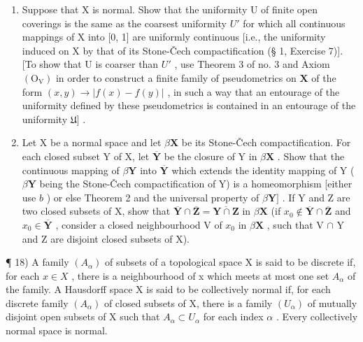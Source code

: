 \begin{enumerate}
\def\labelenumi{\alph{enumi})}
\setcounter{enumi}{1}
\item
  Suppose that X is normal. Show that the uniformity U of finite open coverings is the same as the coarsest uniformity \(U'\) for which all continuous mappings of X into {[}0, 1{]} are uniformly continuous {[}i.e., the uniformity induced on X by that of its Stone-Čech compactification (§ 1, Exercise 7){]}. {[}To show that U is coarser than \(U'\) , use Theorem 3 of no. 3 and Axiom \((\mathrm{O_V})\) in order to construct a finite family of pseudometrics on \(\mathbf{X}\) of the form \((x, y) \to |f(x) - f(y)|\) , in such a way that an entourage of the uniformity defined by these pseudometrics is contained in an entourage of the uniformity \(\mathfrak{U}]\) .
\item
  Let X be a normal space and let \(\beta\mathbf{X}\) be its Stone-Čech compactification. For each closed subset Y of X, let \(\overline{\mathbf{Y}}\) be the closure of Y in \(\beta\mathbf{X}\) . Show that the continuous mapping of \(\beta\mathbf{Y}\) into \(\overline{\mathbf{Y}}\) which extends the identity mapping of Y ( \(\beta\mathbf{Y}\) being the Stone-Čech compactification of Y) is a homeomorphism {[}either use \(b\) ) or else Theorem 2 and the universal property of \(\beta\mathbf{Y}]\) . If Y and Z are two closed subsets of X, show that \(\overline{\mathbf{Y}} \cap \overline{\mathbf{Z}} = \overline{\mathbf{Y} \cap \mathbf{Z}}\) in \(\beta\mathbf{X}\) (if \(x_0 \notin \overline{\mathbf{Y}} \cap \overline{\mathbf{Z}}\) and \(x_0 \in \overline{\mathbf{Y}}\) , consider a closed neighbourhood V of \(x_0\) in \(\beta\mathbf{X}\) , such that V \(\cap\) Y and Z are disjoint closed subsets of X).
\end{enumerate}

¶ 18) A family \((A_{\alpha})\) of subsets of a topological space X is said to be discrete if, for each \(x \in X\) , there is a neighbourhood of x which meets at most one set \(A_{\alpha}\) of the family. A Hausdorff space X is said to be collectively normal if, for each discrete family \((A_{\alpha})\) of closed subsets of X, there is a family \((U_{\alpha})\) of mutually disjoint open subsets of X such that \(A_{\alpha} \subset U_{\alpha}\) for each index \(\alpha\) . Every collectively normal space is normal.

